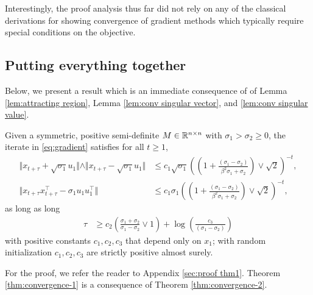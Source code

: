 Interestingly, the proof analysis thus far did not rely on any of the classical derivations for showing convergence of gradient methods which typically require special conditions on the objective.  






\subsection{Putting everything together}

Below, we present a result which is an immediate consequence of of Lemma \ref{lem:attracting region}, Lemma \ref{lem:conv singular vector}, and \ref{lem:conv singular value}. 
\begin{theorem}\label{thm:convergence-2}
Given a symmetric, positive semi-definite $M \in \mathbb{R}^{n\times n}$ with $\sigma_1 > \sigma_2 \geq 0$, the
iterate in \eqref{eq:gradient} satisfies for all $t \ge 1$,  
\begin{align}
\Vert x_{t+\tau} + \sqrt{\sigma_1} u_1 \Vert \wedge \Vert x_{t+\tau} - \sqrt{\sigma_1} u_1 \Vert & \le c_1 \sqrt{\sigma_1}\left(\left(1 + \frac{ (\sigma_1 - \sigma_2)}{ \beta^2 \sigma_1   +  \sigma_2} \right) \vee \sqrt{2} \right)^{-t}, \\ 
\Vert x_{t+\tau}x_{t+\tau}^\top   - \sigma_1 u_1 u_1^\top \Vert & \le  c_1 \sigma_1\left(\left(1 + \frac{ (\sigma_1 - \sigma_2)}{ \beta^2 \sigma_1   +  \sigma_2} \right) \vee \sqrt{2} \right)^{-t},
\end{align}
as long as long 
\begin{align}
\tau  & \ge c_2 \left(\frac{\sigma_1 + \sigma_2}{\sigma_1 - \sigma_2} \vee 1\right) + \log\left(\frac{c_3}{(\sigma_1- \sigma_2)}\right) 
\end{align}
with  positive constants $c_1, c_2, c_3$ that depend only on $x_1$; with random initialization $c_1, c_2, c_3$ are strictly positive almost surely.
\end{theorem}
For the proof, we refer the reader to Appendix \ref{sec:proof thm1}.  Theorem \ref{thm:convergence-1} is a consequence of Theorem \ref{thm:convergence-2}.








